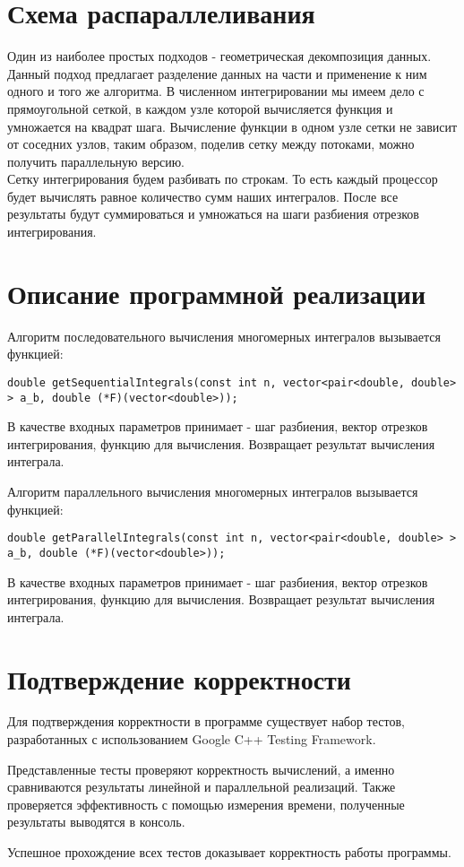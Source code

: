 \documentclass{report}
\begin{document}
\section*{Схема распараллеливания}
Один из наиболее простых подходов - геометрическая декомпозиция данных. Данный подход предлагает разделение данных на части и применение к ним одного и того же алгоритма. В численном интегрировании мы имеем дело с прямоугольной сеткой, в каждом узле которой вычисляется функция и умножается на квадрат шага. Вычисление функции в одном узле сетки не зависит от соседних узлов, таким образом, поделив сетку между потоками, можно получить параллельную версию.
\\ Сетку интегрирования будем разбивать по строкам. То есть каждый процессор будет вычислять равное количество сумм наших интегралов. После все результаты будут суммироваться и умножаться на шаги разбиения отрезков интегрирования.
\newpage

\section*{Описание программной реализации}
Алгоритм последовательного вычисления многомерных интегралов вызывается функцией:
\begin{lstlisting}
double getSequentialIntegrals(const int n, vector<pair<double, double> > a_b, double (*F)(vector<double>));
\end{lstlisting}
\par В качестве входных параметров принимает - шаг разбиения, вектор отрезков интегрирования, функцию для вычисления. Возвращает результат вычисления интеграла.
\par Алгоритм параллельного вычисления многомерных интегралов вызывается функцией:
\begin{lstlisting}
double getParallelIntegrals(const int n, vector<pair<double, double> > a_b, double (*F)(vector<double>));
\end{lstlisting}
\par В качестве входных параметров принимает - шаг разбиения, вектор отрезков интегрирования, функцию для вычисления. Возвращает результат вычисления интеграла.

\newpage

\section*{Подтверждение корректности}
Для подтверждения корректности в программе существует набор тестов, разработанных с использованием Google C++ Testing Framework.
\par 
Представленные тесты проверяют корректность вычислений, а именно сравниваются результаты линейной и параллельной реализаций. Также проверяется эффективность с помощью измерения времени, полученные результаты выводятся в консоль.
\par Успешное прохождение всех тестов доказывает корректность работы программы.
\newpage
\end{document}
